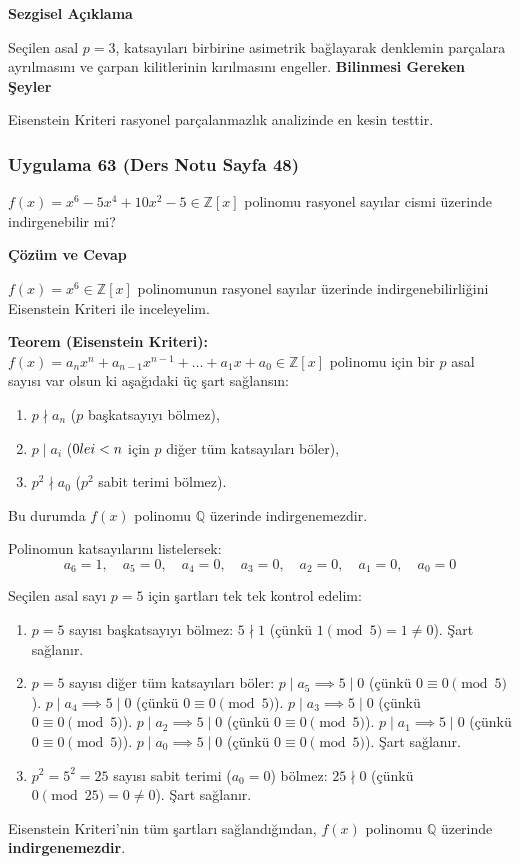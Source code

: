 \documentclass[11pt, a4paper]{article}
\newenvironment{cozum}{
    \vspace{0.5cm}
    \noindent\textcolor{green!60!black}{\faCheckCircle\enspace \textbf{\Large Çözüm ve Cevap}}\par\vspace{0.2cm}
}{}
\newenvironment{sezgisel}{
    \vspace{0.5cm}
    \noindent\textcolor{orange!80!black}{\faLightbulb\enspace \textbf{\Large Sezgisel Açıklama}}\par\vspace{0.2cm}
    \itshape
}{}
\newenvironment{bilgi}{
    \vspace{0.5cm}
    \noindent\textcolor{red!70!black}{\faExclamationTriangle\enspace \textbf{\Large Bilinmesi Gereken Şeyler}}\par\vspace{0.2cm}
}{}
\begin{document}
\begin{sezgisel}
Seçilen asal $p=3$, katsayıları birbirine asimetrik bağlayarak denklemin parçalara ayrılmasını ve çarpan kilitlerinin kırılmasını engeller.
\end{sezgisel}
\begin{bilgi}
Eisenstein Kriteri rasyonel parçalanmazlık analizinde en kesin testtir.
\end{bilgi}

\newpage
\subsubsection{Uygulama 63 (Ders Notu Sayfa 48)}
\begin{sorubox}
$f(x) = x^6 - 5x^4 + 10x^2 - 5 \in \mathbb{Z}[x]$ polinomu rasyonel sayılar cismi üzerinde indirgenebilir mi?
\end{sorubox}
\begin{cozum}
$f(x) = x^{6} \in \mathbb{Z}[x]$ polinomunun rasyonel sayılar üzerinde indirgenebilirliğini Eisenstein Kriteri ile inceleyelim.

\textbf{Teorem (Eisenstein Kriteri):} $f(x) = a_n x^n + a_{n-1} x^{n-1} + \dots + a_1 x + a_0 \in \mathbb{Z}[x]$ polinomu için bir $p$ asal sayısı var olsun ki aşağıdaki üç şart sağlansın:
\begin{enumerate}
    \item $p \nmid a_n$ ($p$ başkatsayıyı bölmez),
    \item $p \mid a_i$ ($0 \\le i < n$ için $p$ diğer tüm katsayıları böler),
    \item $p^2 \nmid a_0$ ($p^2$ sabit terimi bölmez).
\end{enumerate}
Bu durumda $f(x)$ polinomu $\mathbb{Q}$ üzerinde indirgenemezdir.

Polinomun katsayılarını listelersek:
\[ a_{6} = 1, \quad a_{5} = 0, \quad a_{4} = 0, \quad a_{3} = 0, \quad a_{2} = 0, \quad a_{1} = 0, \quad a_{0} = 0 \]

Seçilen asal sayı $p = 5$ için şartları tek tek kontrol edelim:
\begin{enumerate}
    \item $p = 5$ sayısı başkatsayıyı bölmez: $5 \nmid 1$ (çünkü $1 \pmod{5} = 1 \neq 0$). Şart sağlanır.
    \item $p = 5$ sayısı diğer tüm katsayıları böler:
    $p \mid a_{5} \implies 5 \mid 0$ (çünkü $0 \equiv 0 \pmod{5}$).
    $p \mid a_{4} \implies 5 \mid 0$ (çünkü $0 \equiv 0 \pmod{5}$).
    $p \mid a_{3} \implies 5 \mid 0$ (çünkü $0 \equiv 0 \pmod{5}$).
    $p \mid a_{2} \implies 5 \mid 0$ (çünkü $0 \equiv 0 \pmod{5}$).
    $p \mid a_{1} \implies 5 \mid 0$ (çünkü $0 \equiv 0 \pmod{5}$).
    $p \mid a_{0} \implies 5 \mid 0$ (çünkü $0 \equiv 0 \pmod{5}$).
    Şart sağlanır.
    \item $p^2 = 5^2 = 25$ sayısı sabit terimi ($a_0 = 0$) bölmez: $25 \nmid 0$ (çünkü $0 \pmod{25} = 0 \neq 0$). Şart sağlanır.
\end{enumerate}

Eisenstein Kriteri'nin tüm şartları sağlandığından, $f(x)$ polinomu $\mathbb{Q}$ üzerinde \textbf{indirgenemezdir}.
\end{cozum}
\end{document}
